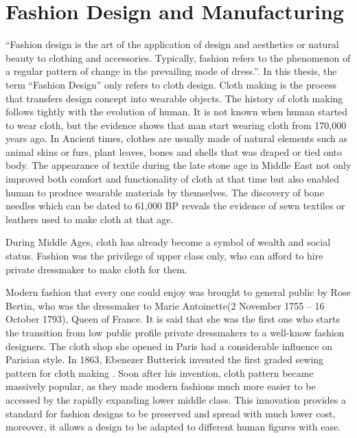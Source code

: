 \section{Fashion Design and Manufacturing}
``Fashion design is the art of the application of design and aesthetics or natural beauty to clothing and accessories. Typically, fashion refers to the phenomenon of a regular pattern of change in the prevailing mode of dress.''. In this thesis, the term ``Fashion Design'' only refers to cloth design. Cloth making is the process that transfers design concept into wearable objects. The history of cloth making follows tightly with the evolution of human. It is not known when human started to wear cloth, but the evidence shows that man start wearing cloth from 170,000 years ago. In Ancient times, clothes are usually made of natural elements such as animal skins or furs, plant leaves, bones and shells that was draped or tied onto body. The appearance of textile during the late stone age in Middle East not only improved both comfort and functionality of cloth at that time but also enabled human to produce wearable materials by themselves. The discovery of bone needles which can be dated to 61,000 BP reveals the evidence of sewn textiles or leathers used to make cloth at that age. 

During Middle Ages, cloth has already become a symbol of wealth and social status. Fashion was the privilege of upper class only, who can afford to hire private dressmaker to make cloth for them. 

Modern fashion that every one could enjoy was brought to general public by Rose Bertin, who was the dressmaker to Marie Antoinette(2 November 1755 – 16 October 1793), Queen of France. It is said that she was the first one who starts the transition from low public profile private dressmakers to a well-know fashion designers.  The cloth shop she opened in Paris had a considerable influence on Parisian style. In 1863, Ebenezer Butterick invented the first graded sewing pattern for cloth making . Soon after his invention, cloth pattern became massively popular, as they made modern fashions much more easier to be accessed by the rapidly expanding lower middle class. This innovation provides a standard for fashion designs to be preserved and spread with much lower cost, moreover, it allows a design to be adapted to different human figures with ease. 

